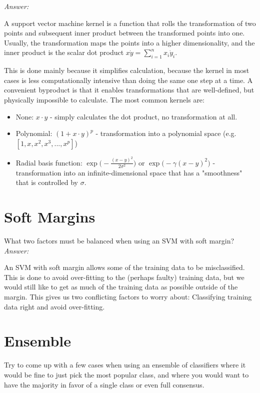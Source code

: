 \textit{Answer:}

A support vector machine kernel is a function that rolls the transformation of two points and subsequent inner product between the transformed points into one.
Usually, the transformation maps the points into a higher dimensionality, and the inner product is the scalar dot product \(x \dot y = \sum\limits_{i=1}^{n} x_i \dot y_i\).

This is done mainly because it simplifies calculation, because the kernel in most cases is less computationally intensive than doing the same one step at a time.
A convenient byproduct is that it enables transformations that are well-defined, but physically impossible to calculate.
The most common kernels are:
\begin{itemize}
    \item None: \(x \cdot y\) - simply calculates the dot product, no transformation at all.
    \item Polynomial: \((1 + x \cdot y)^p\) - transformation into a polynomial space (e.g. \([1,x,x^2,x^3,...,x^p]\))
    \item Radial basis function: \(\exp\big(-\frac{(x-y)^2}{2\sigma^2}\big)\) or  \(\exp\big(-\gamma(x-y)^2\big)\) - transformation into an infinite-dimensional space that has a "smoothness" that is controlled by \(\sigma\).
\end{itemize}

\section{Soft Margins}
What two factors must be balanced when using an SVM with soft margin?\\

\textit{Answer:}

An SVM with soft margin allows some of the training data to be misclassified.
This is done to avoid over-fitting to the (perhaps faulty) training data, but we would still like to get as much of the training data as possible outside of the margin.
This gives us two conflicting factors to worry about: Classifying training data right and avoid over-fitting.

\section{Ensemble}
Try to come up with a few cases when using an ensemble of classifiers where it would be fine to just pick the most popular class, and where you would want to have the majority in favor of a single class or even full consensus.\\

